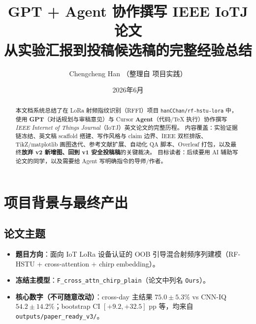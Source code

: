 \documentclass[11pt,a4paper]{ctexart}
\title{\Large GPT + Agent 协作撰写 IEEE IoTJ 论文\\[0.3em]
\large 从实验汇报到投稿候选稿的完整经验总结}
\author{Chengcheng Han \quad（整理自 \repo{} 项目实践）}
\date{2026年6月}
\newcommand{\repo}{\texttt{hanCChan/rf-hstu-lora}}
\newcommand{\agent}{\textbf{Agent}}
\newcommand{\gpt}{\textbf{GPT}}
\begin{document}
\maketitle

\begin{abstract}
本文档系统总结了在 LoRa 射频指纹识别（RFFI）项目 \repo{} 中，使用 \gpt{}（对话规划与审稿意见）与 Cursor \agent{}（代码/TeX 执行）协作撰写 \emph{IEEE Internet of Things Journal}（IoTJ）英文论文的完整历程。
内容覆盖：实验证据链冻结、英文稿 scaffold 搭建、写作风格与 claim 边界、IEEE 双栏排版、TikZ/matplotlib 画图迭代、参考文献扩展、自动化 QA 脚本、Overleaf 打包，以及最终\textbf{放弃 v2 新增图、回到 v1 安全投稿稿}的关键裁决。
目标读者：后续要用 AI 辅助写论文的同学，以及需要给 Agent 写明确指令的导师/作者。
\end{abstract}

\tableofcontents
\newpage

\section{项目背景与最终产出}

\subsection{论文主题}
\begin{itemize}
  \item \textbf{题目方向}：面向 IoT LoRa 设备认证的 OOB 引导混合射频序列建模（RF-HSTU + cross-attention + chirp embedding）。
  \item \textbf{冻结主模型}：\texttt{F\_cross\_attn\_chirp\_plain}（论文中列名 \texttt{Ours}）。
  \item \textbf{核心数字（不可随意改动）}：cross-day 主结果 $75.0\pm5.3\%$ vs CNN-IQ $54.2\pm14.2\%$；bootstrap CI $[+9.2,+32.5]$ pp 等，均来自 \texttt{outputs/paper\_ready\_v3/}。
\end{itemize}
\end{document}

